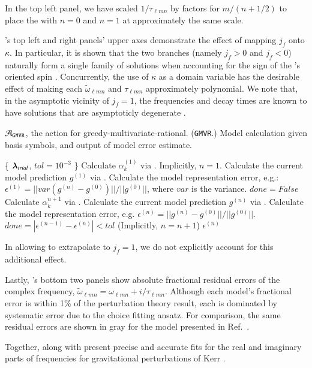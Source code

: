 \documentclass[twocolumn,aps,prd,floatfix,preprintnumbers,a4paper,nofootinbib,
superscriptaddress,10pt]{revtex4-1}
\newcommand{\cw}{\tilde{\omega}}
\def\jf{j_f}
\def\lmn{_{\ell m n}}
\def\gmvr#1{greedy-multivariate-rational#1
  (\texttt{GMVR}#1)\gdef\gmvr{\texttt{GMVR}}}
\begin{document}
%
In the top left panel, we have scaled $1/\tau\lmn$ by factors for $m/(n+1/2)$ to place the  with $n=0$ and $n=1$ at approximately the same scale.
%
\begin{widetext}
	
\end{widetext}
%
\par {}'s top left and right panels' upper axes demonstrate the effect of mapping $\jf$ onto $\kappa$.
%
In particular, it is shown that the two branches (namely $\jf>0$ and $\jf<0$) naturally form a single family of solutions when accounting for the sign of the \bh{}'s oriented spin \cite{Husa:2007hp}.
%
Concurrently, the use of $\kappa$ as a domain variable has the desirable effect of making each $\cw\lmn$ and $\tau\lmn$ approximately polynomial.
%
We note that, in the asymptotic vicinity of $\jf=1$, the \qnm{} frequencies and decay times are known to have solutions that are asymptoticly degenerate \cite{Zimmerman:2015rua}.
%
{\scriptsize
\begin{algorithm}[H]
  \caption{$\mathcal{A}_{\gmvr}$, the action for \gmvr. Model calculation given basis symbols, and output of model error estimate.}
  \label{alg:A_gmvr}
  \begin{algorithmic}[1]
     \{ ${\bm{\lambda}}_{trial}$, $tol=10^{-3}$ \}
    \vskip 10pt
    \State Calculate $\alpha^{(1)}_k$ via . Implicitly, $n=1$.
    \State Calculate the current model prediction $g^{(1)}$ via .
    \State Calculate the model representation error, e.g.: $\epsilon^{(1)}  = ||var(g^{(n)} - g^{(0)})||/||g^{(0)}||$, where $var$ is the variance.
    \State $done = False$
      \State Calculate $\alpha^{n+1}_{k}$  via .
      \State Calculate the current model prediction $g^{(n)}$ via .
      \State Calculate the model representation error, e.g. $\epsilon^{(n)} = ||g^{(n)} - g^{(0)}||/||g^{(0)}||$.
      \State $done = |\epsilon^{(n-1)}-\epsilon^{(n)}| < tol$
      \State (Implicitly, $n = n+1$)
    \EndWhile
    \vskip 10pt
     $\epsilon^{(n)}$
  \end{algorithmic}
\end{algorithm}
}
%
In allowing  to extrapolate to $\jf=1$, we do not explicitly account for this additional effect.
%
\par Lastly, 's bottom two panels show absolute fractional residual errors of the complex frequency, $\cw\lmn = \omega\lmn + i/\tau\lmn$.
%
Although each model's fractional error is within 1\% of the perturbation theory result, each is dominated by systematic error due to the choice fitting ansatz.
%
For comparison, the same residual errors are shown in gray for the model presented in Ref.~\cite{Berti:2005ys}.
%
\par Together,  along with  present precise and accurate fits for the real and imaginary parts of \qnm{} frequencies for gravitational perturbations of Kerr .
%
%
\end{document}
